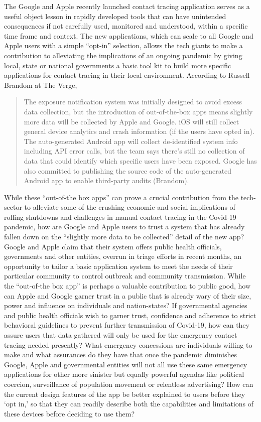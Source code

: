 \documentclass[11pt,dvipdfm]{article}
\begin{document}
The Google and Apple recently launched contact tracing application serves as a useful object lesson in rapidly developed tools that can have unintended consequences if not carefully used, monitored and understood, within a specific time frame and context.  The new applications, which can scale to all Google and Apple users with a simple “opt-in” selection, allows the tech giants to make a contribution to alleviating the implications of an ongoing pandemic by giving local, state or national governments a basic tool kit to build more specific applications for contact tracing in their local environment.  According to Russell Brandom at The Verge,
\begin{quote}
	The exposure notification system was initially designed to avoid excess data collection, but the introduction of out-of-the-box apps means slightly more data will be collected by Apple and Google. iOS will still collect general device analytics and crash information (if the users have opted in). The auto-generated Android app will collect de-identified system info including API error calls, but the team says there’s still no collection of data that could identify which specific users have been exposed. Google has also committed to publishing the source code of the auto-generated Android app to enable third-party audits (Brandom).
\end{quote}
While these “out-of-the box apps” can prove a crucial contribution from the tech-sector to alleviate some of the crushing economic and social implications of rolling shutdowns and challenges in manual contact tracing in the Covid-19 pandemic, how are Google and Apple users to trust a system that has already fallen down on the “slightly more data to be collected” detail of the new app?  Google and Apple claim that their system offers public health officials, governments and other entities, overrun in triage efforts in recent months, an opportunity to tailor a basic application system to meet the needs of their particular community to control outbreak and community transmission.  While the “out-of-the box app” is perhaps a valuable contribution to public good, how can Apple and Google garner trust in a public that is already wary of their size, power and influence on individuals and nation-states?  If governmental agencies and public health officials wish to garner trust, confidence and adherence to strict behavioral guidelines to prevent further transmission of Covid-19, how can they assure users that data gathered will only be used for the emergency contact tracing needed presently?  What emergency concessions are individuals willing to make and what assurances do they have that once the pandemic diminishes Google, Apple and governmental entities will not all use these same emergency applications for other more sinister but equally powerful agendas like political coercion, surveillance of population movement or relentless advertising?  How can the current design features of the app be better explained to users before they ‘opt in,’ so that they can readily describe both the capabilities and limitations of these devices before deciding to use them?
\end{document}
